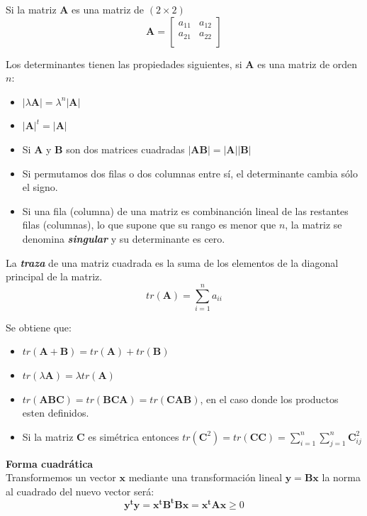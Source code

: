 \documentclass[12pt,letterpaper]{report} %
\begin{document}
Si la matriz $\mathbf{A}$ es una matriz de $(2 \times 2)$
$$
\mathbf{A}=
\begin{bmatrix}
a_{11} & a_{12} \\
a_{21} & a_{22} \\
\end{bmatrix}
$$

Los determinantes tienen las propiedades siguientes, si $\mathbf{A}$ es una matriz de orden $n$:
\begin{itemize}
\item $|\lambda \mathbf{A}|=\lambda^n|\mathbf{A}|$
\item $|\mathbf{A}|^t=|\mathbf{A}|$
\item Si $\mathbf{A}$ y $\mathbf{B}$ son dos matrices cuadradas $|\mathbf{A}\mathbf{B}|=|\mathbf{A}||\mathbf{B}|$
\item Si permutamos dos filas o dos columnas entre sí, el determinante cambia sólo el signo.
\item Si una fila (columna) de una matriz es combinanción lineal de las restantes filas (columnas), lo que supone que su rango es menor que $n$, la matriz se denomina \textit{\textbf{singular}} y su determinante es cero.	
\end{itemize}

La \textit{\textbf{traza}} de una matriz cuadrada es la suma de los elementos de la diagonal principal de la matriz.
$$tr(\mathbf{A})=\sum_{i=1}^{n}a_{ii}$$

Se obtiene que:
\begin{itemize}
\item  $tr(\mathbf{A}+\mathbf{B})=tr(\mathbf{A})+tr(\mathbf{B})$
\item $tr(\lambda\mathbf{A})=\lambda tr(\mathbf{A})$
\item $tr(\mathbf{A}\mathbf{B}\mathbf{C})=tr(\mathbf{B}\mathbf{C}\mathbf{A})=tr(\mathbf{C}\mathbf{A}\mathbf{B})$, en el caso donde los productos esten definidos.
\item Si la matriz $\mathbf{C}$ es simétrica entonces $tr(\mathbf{C}^2)=tr(\mathbf{C}\mathbf{C})=\sum_{i=1}^{n}\sum_{j=1}^{n}\mathbf{C}_{ij}^2$
\end{itemize} 

\textbf{Forma cuadrática} \\

Transformemos un vector $\mathbf{x}$ mediante una transformación lineal $\mathbf{y}=\mathbf{Bx}$ la norma al cuadrado del nuevo vector será:
$$\mathbf{y^ty}=\mathbf{x^tB^tBx}=\mathbf{x^tAx}\ge 0$$
\end{document}
